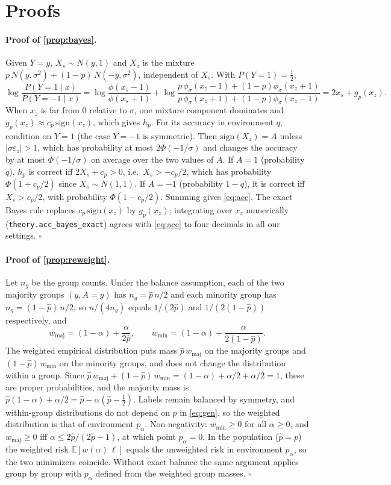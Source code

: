 \documentclass{article}
\newcommand{\E}{\mathbb{E}}
\newcommand{\sign}{\mathrm{sign}}
\begin{document}
\section{Proofs}
\label{app:proofs}

\paragraph{Proof of \cref{prop:bayes}.} Given $Y=y$, $X_s\sim N(y,1)$ and $X_z$ is the mixture
$p\,N(y,\sigma^2)+(1-p)\,N(-y,\sigma^2)$, independent of $X_s$. With $P(Y=1)=\tfrac12$,
\[
\log\frac{P(Y=1\mid x)}{P(Y=-1\mid x)}
=\log\frac{\phi(x_s-1)}{\phi(x_s+1)}+\log\frac{p\,\phi_\sigma(x_z-1)+(1-p)\phi_\sigma(x_z+1)}{p\,\phi_\sigma(x_z+1)+(1-p)\phi_\sigma(x_z-1)}
=2x_s+g_p(x_z).
\]
When $x_z$ is far from 0 relative to $\sigma$, one mixture component dominates and
$g_p(x_z)\approx c_p\,\sign(x_z)$, which gives $h_p$. For its accuracy in environment $q$, condition on
$Y=1$ (the case $Y=-1$ is symmetric). Then $\sign(X_z)=A$ unless $|\sigma\varepsilon_z|>1$, which has
probability at most $2\Phi(-1/\sigma)$ and changes the accuracy by at most $\Phi(-1/\sigma)$ on
average over the two values of $A$. If $A=1$ (probability $q$), $h_p$ is correct iff
$2X_s+c_p>0$, i.e.\ $X_s>-c_p/2$, which has probability $\Phi(1+c_p/2)$ since $X_s\sim N(1,1)$. If
$A=-1$ (probability $1-q$), it is correct iff $X_s>c_p/2$, with probability $\Phi(1-c_p/2)$. Summing
gives \eqref{eq:acc}. The exact Bayes rule replaces $c_p\,\sign(x_z)$ by $g_p(x_z)$; integrating over
$x_z$ numerically (\texttt{theory.acc\_bayes\_exact}) agrees with \eqref{eq:acc} to four decimals in all
our settings. \hfill$\square$

\paragraph{Proof of \cref{prop:reweight}.} Let $n_g$ be the group counts. Under the balance assumption,
each of the two majority groups $(y,A=y)$ has $n_g=\hat p\,n/2$ and each minority group has
$n_g=(1-\hat p)\,n/2$, so $n/(4n_g)$ equals $1/(2\hat p)$ and $1/(2(1-\hat p))$ respectively, and
\[
w_{\text{maj}}=(1-\alpha)+\frac{\alpha}{2\hat p},\qquad
w_{\text{min}}=(1-\alpha)+\frac{\alpha}{2(1-\hat p)}.
\]
The weighted empirical distribution puts mass $\hat p\,w_{\text{maj}}$ on the majority groups and
$(1-\hat p)\,w_{\text{min}}$ on the minority groups, and does not change the distribution within a
group. Since $\hat p\,w_{\text{maj}}+(1-\hat p)\,w_{\text{min}}=(1-\alpha)+\alpha/2+\alpha/2=1$, these are
proper probabilities, and the majority mass is $\hat p(1-\alpha)+\alpha/2=\hat p-\alpha(\hat p-\tfrac12)$.
Labels remain balanced by symmetry, and within-group distributions do not depend on $p$ in
\eqref{eq:gen}, so the weighted distribution is that of environment $p_\alpha$. Non-negativity:
$w_{\text{min}}\ge0$ for all $\alpha\ge0$, and $w_{\text{maj}}\ge0$ iff
$\alpha\le 2\hat p/(2\hat p-1)$, at which point $p_\alpha=0$. In the population ($\hat p=p$) the
weighted risk $\E[w(\alpha)\,\ell]$ equals the unweighted risk in environment $p_\alpha$, so the two
minimizers coincide. Without exact balance the same argument applies group by group with
$p_\alpha$ defined from the weighted group masses. \hfill$\square$
\end{document}
